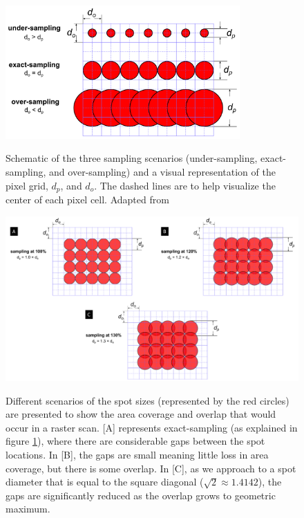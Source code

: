 \documentclass[12pt]{article}
\begin{document}
\begin{figure}[h!]
\begin{center}
{
 \includegraphics[width=0.8\textwidth]{figures/sampling.png}
}
\caption{\label{fig_sampling} Schematic of the three sampling scenarios (under-sampling, exact-sampling, and over-sampling) and a visual representation of the pixel grid, $d_p$, and $d_o$. The dashed lines are to help visualize the center of each pixel cell. Adapted from \citet{lifshin_improving_2014}}
\end{center}
\end{figure}

\begin{landscape}
\setlength{\belowcaptionskip}{-30pt}
\vspace*{\fill}
\begin{figure}[h!]
\begin{center}
{
 \includegraphics[width=1.3\textwidth]{figures/spot_ratio/sampling_ratios.pdf}
}
\caption{\label{fig_samp_ratios} Different scenarios of the spot sizes (represented by the red circles) are presented to show the area coverage and overlap that would occur in a raster scan. [A] represents exact-sampling (as explained in figure \ref{fig_sampling}), where there are considerable gaps between the spot locations. In [B], the gaps are small meaning little loss in area coverage, but there is some overlap. In [C], as we approach to a spot diameter that is equal to the square diagonal ($\sqrt{2} \approx 1.4142$), the gaps are significantly reduced as the overlap grows to geometric maximum.}
\end{center}
\end{figure}
\vspace*{\fill}
\setlength{\belowcaptionskip}{10pt}
\end{landscape}
\end{document}
